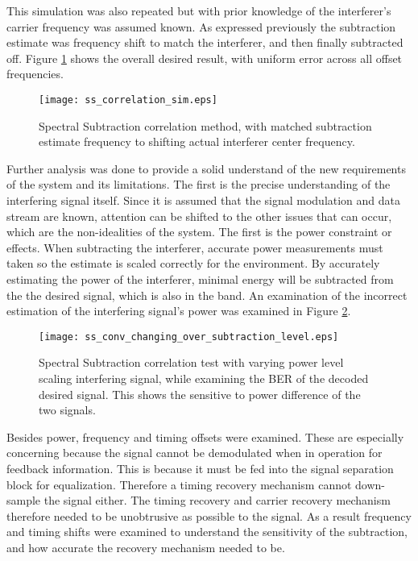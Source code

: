 This simulation was also repeated but with prior knowledge of the interferer's carrier frequency was assumed known.  As expressed previously the subtraction estimate was frequency shift to match the interferer, and then finally subtracted off.  Figure \ref{ss_correlate_GG} shows the overall desired result, with uniform error across all offset frequencies.\\

\begin{figure}[!ht]\label{ss_correlate_GG}
\centering
\texttt{[image: ss\_correlation\_sim.eps]}
\caption{Spectral Subtraction correlation method, with matched subtraction estimate frequency to shifting actual interferer center frequency.}
\end{figure} 

Further analysis was done to provide a solid understand of the new requirements of the system and its limitations.  The first is the precise understanding of the interfering signal itself.  Since it is assumed that the signal modulation and data stream are known, attention can be shifted to the other issues that can occur, which are the non-idealities of the system.  The first is the power constraint or effects.  When subtracting the interferer, accurate power measurements must taken so the estimate is scaled correctly for the environment.  By accurately estimating the power of the interferer, minimal energy will be subtracted from the the desired signal, which is also in the band.  An examination of the incorrect estimation of the interfering signal's power was examined in Figure \ref{fig:power_delta}.

\begin{figure}[!ht]\label{fig:power_delta}  
\centering
\texttt{[image: ss\_conv\_changing\_over\_subtraction\_level.eps]}
\caption{Spectral Subtraction correlation test with varying power level scaling interfering signal, while examining the BER of the decoded desired signal.  This shows the sensitive to power difference of the two signals.}
\end{figure}

Besides power, frequency and timing offsets were examined.  These are especially concerning because the signal cannot be demodulated when in operation for feedback information. This is because it must be fed into the signal separation block for equalization.  Therefore a timing recovery mechanism cannot down-sample the signal either.  The timing recovery and carrier recovery mechanism therefore needed to be unobtrusive as possible to the signal.  As a result frequency and timing shifts were examined to understand the sensitivity of the subtraction, and how accurate the recovery mechanism needed to be.

